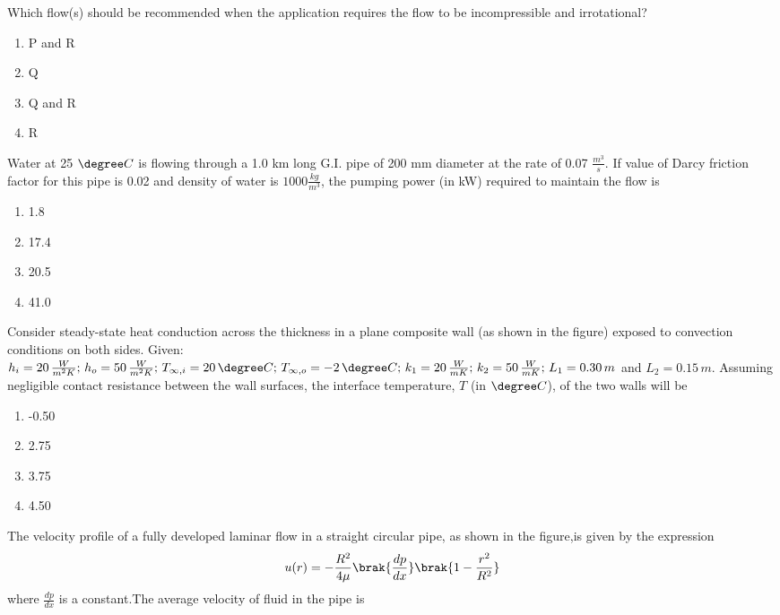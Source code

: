Which flow(s) should be recommended when the application requires the flow to be incompressible and irrotational?
\begin{enumerate}
    \item  P and R
    \item  Q
    \item  Q and R
    \item  R
  \end{enumerate}
\item Water at 25 $\degree C$ is flowing through a 1.0 km long G.I. pipe of 200 mm diameter at the rate of 0.07 $\frac{m^3}{s}$. If value of Darcy friction factor for this pipe is 0.02 and density of water is $1000 \frac{kg}{m^3}$, the pumping power (in kW) required to maintain the flow is
\begin{enumerate}
    \item  1.8
    \item  17.4
    \item  20.5
    \item  41.0
  \end{enumerate}
  \item Consider steady-state heat conduction across the thickness in a plane composite wall (as shown in the figure) exposed to convection conditions on both sides.
Given: $h_i = 20 \, \frac{W}{m^2K}; \, h_o = 50 \, \frac{W}{m^2K}; \, T_{\infty,i} = 20 \,\degree C; \, T_{\infty,o} = -2 \,\degree C; \, k_1 = 20 \, \frac{W}{mK}; \, k_2 = 50 \, \frac{W}{mK}; \, L_1 = 0.30 \, m$ and $L_2 = 0.15 \, m$. 
Assuming negligible contact resistance between the wall surfaces, the interface temperature, $T$ (in $\degree C$), of the two walls will be
 \begin{figure}[!ht]
    \centering
    \label{fig:composite wall}
    \end{figure}
\begin{enumerate}
    \item  -0.50
    \item  2.75
    \item  3.75
    \item  4.50
  \end{enumerate} 
\item The velocity profile of a fully developed laminar flow in a straight circular pipe, as shown in the figure,is given by the expression
$$ u(r) = -\frac{R^2}{4 \mu} \brak{\frac{dp}{dx}}\brak{1 - \frac{r^2}{R^2}}$$ where $\frac{dp}{dx}$ is a constant.The average velocity of fluid in the pipe is
